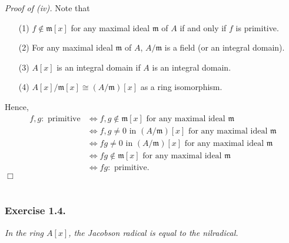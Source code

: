 \documentclass{article}
\begin{document}
\emph{Proof of (iv).}
Note that
\begin{enumerate}
\item[(1)]
  $f \notin \mathfrak{m}[x]$ for any maximal ideal $\mathfrak{m}$ of $A$
  if and only if $f$ is primitive.

\item[(2)]
  For any maximal ideal $\mathfrak{m}$ of $A$,
  $A/\mathfrak{m}$ is a field (or an integral domain).

\item[(3)]
  $A[x]$ is an integral domain if $A$ is an integral domain.

\item[(4)]
  $A[x]/\mathfrak{m}[x] \cong (A/\mathfrak{m})[x]$ as a ring isomorphism.
  \end{enumerate}
  Hence,
  \begin{align*}
    f, g:\text{ primitive}
    &\Longleftrightarrow
    f, g \notin \mathfrak{m}[x] \text{ for any maximal ideal } \mathfrak{m} \\
    &\Longleftrightarrow
    f, g \neq 0 \text{ in } (A/\mathfrak{m})[x] \text{ for any maximal ideal } \mathfrak{m} \\
    &\Longleftrightarrow
    fg \neq 0 \text{ in } (A/\mathfrak{m})[x] \text{ for any maximal ideal } \mathfrak{m} \\
    &\Longleftrightarrow
    fg \notin \mathfrak{m}[x] \text{ for any maximal ideal } \mathfrak{m} \\
    &\Longleftrightarrow
    fg:\text{ primitive}.
  \end{align*}
$\Box$ \\\\






\subsubsection*{Exercise 1.4.}
\emph{In the ring $A[x]$, the Jacobson radical is equal to the nilradical.} \\
\end{document}
